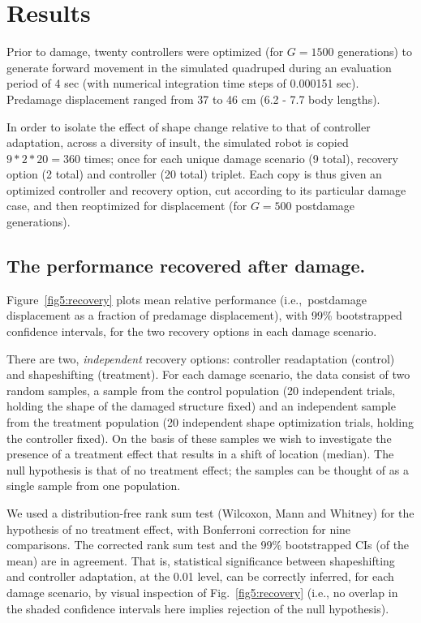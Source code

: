 
\section{Results}
\label{sec5:results}


Prior to damage, twenty controllers were optimized (for \mbox{$G=1500$} generations) to generate forward movement in the simulated quadruped during an evaluation period of 4 sec (with numerical integration time steps of 0.000151 sec).
Predamage displacement ranged from 37 to 46 cm (6.2 - 7.7 body lengths).

In order to isolate the effect of shape change relative to that of controller adaptation, across a diversity of insult, the simulated robot is copied $9*2*20=360$ times; once for each unique damage scenario (9 total), recovery option (2 total) and controller (20 total) triplet. 
Each copy is thus given an optimized controller and recovery option, cut according to its particular damage case, and then reoptimized for displacement (for \mbox{$G=500$} postdamage generations).

\subsection*{The performance recovered after damage.}


Figure~\ref{fig5:recovery} plots 
mean relative performance (i.e.,~postdamage displacement as a fraction of predamage displacement),
with 99\% bootstrapped confidence intervals,
for the two recovery options in each damage scenario. 

 

There are two, \textit{independent} recovery options: controller readaptation (control) and shapeshifting (treatment).
For each damage scenario,
the data consist of two random samples, a sample from the control population (20 independent trials, holding the shape of the damaged structure fixed) and an independent sample from the treatment population (20 independent shape optimization trials, holding the controller fixed).
On the basis of these samples we wish to investigate the presence of a treatment effect that results in a shift of location (median).
The null hypothesis is that of no treatment effect; 
the samples can be thought of as a single sample from one population. 

We used a distribution-free rank sum test (Wilcoxon, Mann and Whitney) for the hypothesis of no treatment effect, with Bonferroni correction for nine comparisons.
The corrected rank sum test and the 99\% bootstrapped CIs (of the mean) are in agreement.
That is, statistical significance between shapeshifting and controller adaptation, at the 0.01 level, can be correctly inferred, for each damage scenario, by visual inspection of Fig.~\ref{fig5:recovery} (i.e., no overlap in the shaded confidence intervals here implies rejection of the null hypothesis).

